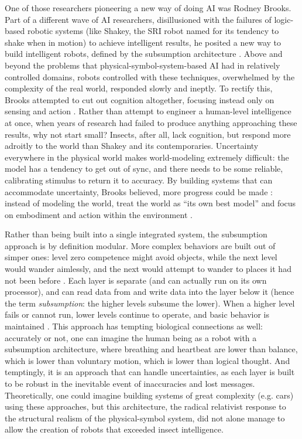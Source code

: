 One of those researchers pioneering a new way of doing AI was Rodney
Brooks. Part of a different wave of AI researchers, disillusioned with
the failures of logic-based robotic systems (like Shakey, the SRI
robot named for its tendency to shake when in motion) \cite[Ch. 10]{mccorduck} to
achieve intelligent results, he posited a new way to build intelligent
robots, defined by the subsumption architecture \cite[p. 353]{mobilebrooks}. Above and
beyond the problems that physical-symbol-system-based AI had in
relatively controlled domains, robots controlled with these
techniques, overwhelmed by the complexity of the real world, responded
slowly and ineptly. To rectify this, Brooks attempted to cut out
cognition altogether, focusing instead only on sensing and
action \cite[Afterword]{mccorduck}. Rather than attempt to engineer a
human-level intelligence at once, when years of research had failed to
produce anything approaching these results, why not start small?
Insects, after all, lack cognition, but respond more adroitly to the
world than Shakey and its contemporaries. Uncertainty everywhere in
the physical world makes world-modeling extremely difficult: the
model has a tendency to get out of sync, and there needs to be
some reliable, calibrating stimulus to return it to accuracy. By building systems that can
accommodate uncertainty, Brooks believed, more progress could be
made \cite[p. 347]{mobilebrooks}: instead of modeling the world, treat
the world as ``its own best model'' and focus on embodiment and action
within the environment \cite[p. 256]{ekbia}.

Rather than being built into a single integrated system, the
subsumption approach is by definition modular. More complex behaviors
are built out of simper ones: level zero competence might avoid objects,
while the next level would wander aimlessly, and the next would
attempt to wander to places it had not been before \cite[p.
  351--352]{mobilebrooks}. Each layer is separate (and can actually run 
on its own processor), and can read data from
and write data into the layer below it (hence the term \emph{subsumption}: 
the higher levels subsume the lower). When a higher level fails or
cannot run, lower levels continue to operate, and basic behavior is
maintained \cite[p. 355]{mobilebrooks}. This approach has tempting
biological connections as well:
accurately or not, one can imagine the human being as a robot with a subsumption
architecture, where breathing and heartbeat are lower than balance,
which is lower than voluntary motion, which is lower than logical
thought. And temptingly, it is an approach that can handle
uncertainties, as each layer is built to be robust in the inevitable
event of inaccuracies and lost messages. Theoretically, one could
imagine building systems of great complexity (e.g. cars) using these approaches,
but this architecture, the radical relativist response to the
structural realism of the physical-symbol system, did not alone manage
to allow the creation of robots that exceeded insect intelligence.

